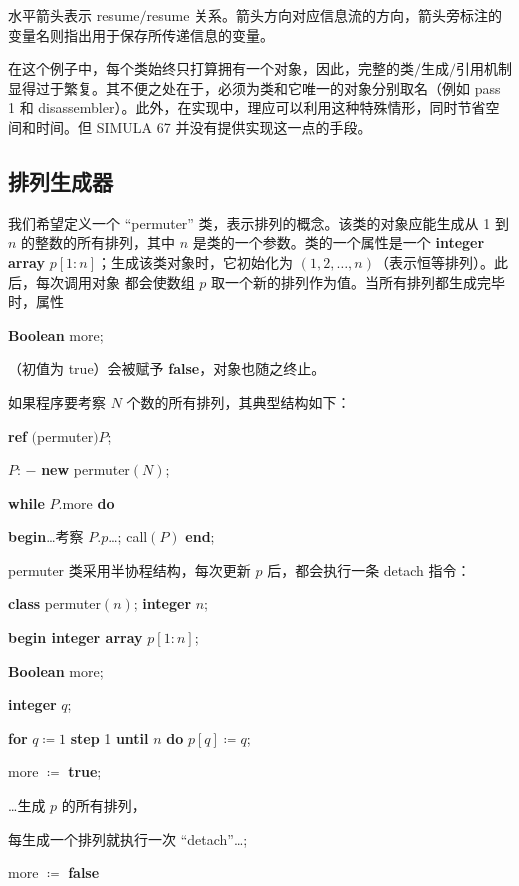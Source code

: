 \documentclass[twoside,11pt,fontset=none]{ctexbook}
\begin{document}
\noindent
水平箭头表示 resume$/$resume 关系。箭头方向对应信息流的方向，箭头旁标注的变量名则指出用于保存所传递信息的变量。

在这个例子中，每个类始终只打算拥有一个对象，因此，完整的类$/$生成$/$引用机制显得过于繁复。其不便之处在于，必须为类和它唯一的对象分别取名（例如 pass 1 和 disassembler）。此外，在实现中，理应可以利用这种特殊情形，同时节省空间和时间。但 SIMULA 67 并没有提供实现这一点的手段。

\subsection{排列生成器}

我们希望定义一个 ``permuter'' 类，表示排列的概念。该类的对象应能生成从 1 到 $n$ 的整数的所有排列，其中 $n$ 是类的一个参数。类的一个属性是一个 \textbf{integer array} $p[1:n]$；生成该类对象时，它初始化为 $(1, 2, \dots, n)$（表示恒等排列）。此后，每次调用对象
都会使数组 $p$ 取一个新的排列作为值。当所有排列都生成完毕时，属性

\quad \textbf{Boolean} more;

\noindent
（初值为 true）会被赋予 \textbf{false}，对象也随之终止。

如果程序要考察 $N$ 个数的所有排列，其典型结构如下：

\quad \textbf{ref} $($permuter$)P$;

\quad $P$: $-$ \textbf{new} permuter$(N)$;

\quad \textbf{while} $P$.more \textbf{do}

\quad \quad \textbf{begin}\dots 考察 $P.p$\dots; call$(P)$ \textbf{end};

\noindent
permuter 类采用半协程结构，每次更新 $p$ 后，都会执行一条 detach 指令：

\quad \textbf{class} permuter$(n)$; \textbf{integer} $n$;

\quad \quad \textbf{begin integer array} $p[1:n]$;

\quad \quad \quad \textbf{Boolean} more;

\quad \quad \quad \textbf{integer} $q$;

\quad \quad \quad \textbf{for} $q\coloneq 1$ \textbf{step} 1 \textbf{until} $n$ \textbf{do} $p[q]\coloneq q$;

\quad \quad \quad more $\coloneq$ \textbf{true};

\tabto*{3.3em} \dots 生成 $p$ 的所有排列，

\quad \quad \quad 每生成一个排列就执行一次 ``detach''\dots;

\quad \quad \quad more $\coloneq$ \textbf{false}
\end{document}
